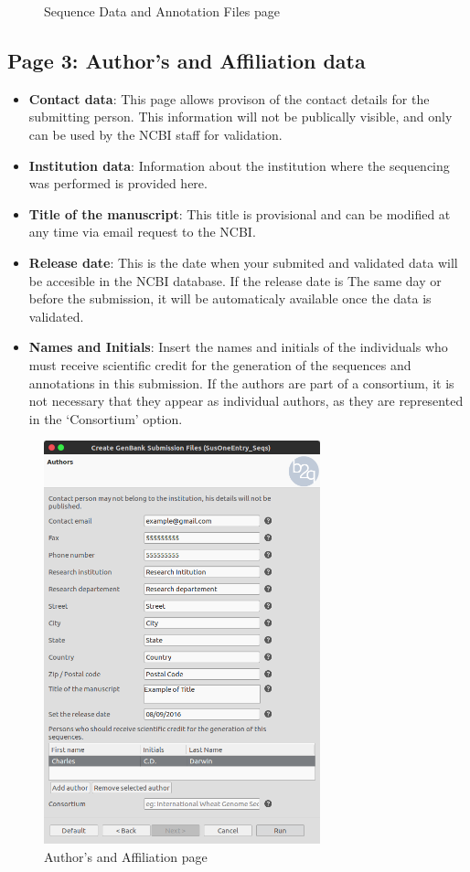 \begin{figure}
\begin{minipage}{.5\textwidth}
 \caption{Sequence Data and Annotation Files page}
  \label{fig:test2}
\end{minipage}
\end{figure}

\newpage
\subsection {Page 3: Author's and Affiliation data}
\begin{itemize}
  \item \textbf{Contact data}: This page allows provison of the contact details
  for the submitting person. This information will not be publically visible,
  and only can be used by the NCBI staff for validation.
  \item \textbf{Institution data}: Information about the institution where the
  sequencing was performed is provided here.
  \item \textbf{Title of the manuscript}: This title is provisional and can be
  modified at any time via email request to the NCBI.
  \item \textbf{Release date}: This is the date when your submited and validated
  data will be accesible in the NCBI database. If the release date is The same
  day or before the submission, it will be automaticaly available once the data
  is validated.
  \item \textbf{Names and Initials}: Insert the names and initials of the
  individuals who must receive scientific credit for the generation of the
  sequences and annotations in this submission. If the authors are part of a
  consortium, it is not necessary that they appear as individual authors, as
  they are represented in the `Consortium' option.
\end{itemize}



\begin{figure}[!h] \centering
\includegraphics[width=80mm]{img/WizardPage3.png}
\caption{Author's and Affiliation page}
\label{fig:ncbisublinkfiles}
\end{figure}



